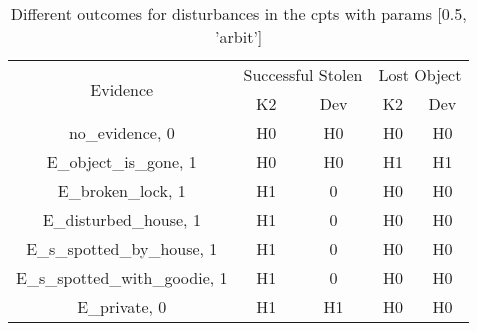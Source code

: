 \begin{table}\begin{tabular}{c|cc|cc}\toprule\multirow{2}{*}{Evidence} & \multicolumn{2}{c}{Successful Stolen} & \multicolumn{2}{c}{Lost Object} \\& {K2} & {Dev} & {K2} & {Dev} \\\midrule
no\_evidence, 0 & H0&H0&H0&H0\\E\_object\_is\_gone, 1 & H0&H0&H1&H1\\E\_broken\_lock, 1 & \cellcolor{Bittersweet}H1&\cellcolor{Bittersweet}0&H0&H0\\E\_disturbed\_house, 1 & \cellcolor{Bittersweet}H1&\cellcolor{Bittersweet}0&H0&H0\\E\_s\_spotted\_by\_house, 1 & \cellcolor{Bittersweet}H1&\cellcolor{Bittersweet}0&H0&H0\\E\_s\_spotted\_with\_goodie, 1 & \cellcolor{Bittersweet}H1&\cellcolor{Bittersweet}0&H0&H0\\E\_private, 0 & H1&H1&H0&H0\\\bottomrule\end{tabular}\caption{Different outcomes for disturbances in the cpts with params [0.5, 'arbit']}\end{table}